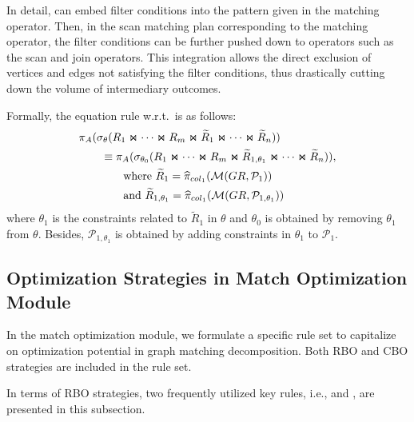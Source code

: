 In detail, \filterrule can embed filter conditions into the pattern given in the matching operator.
Then, in the scan matching plan corresponding to the matching operator, the filter conditions can be further pushed down to operators such as the scan and join operators.
This integration allows the direct exclusion of vertices and edges not satisfying the filter conditions, thus drastically cutting down the volume of intermediary outcomes.

Formally, the equation rule w.r.t.~\filterrule is as follows:
\begin{equation}
    \begin{split}
        & \pi_A(\sigma_{\theta}(R_1 \Join \cdots \Join R_m \Join \widetilde{R}_1 \Join \cdots \Join \widetilde{R}_n)) \\
        & \hspace*{2em} \equiv \pi_A(\sigma_{\theta_0}(R_1 \Join \cdots \Join R_m \Join \widetilde{R}_{1, \theta_1} \Join \cdots \Join \widetilde{R}_n)), \\
        & \hspace*{4em} \text{where } \widetilde{R}_{1} = \widehat{\pi}_{col_1}(\mathcal{M}(GR, \mathcal{P}_1)) \\
        & \hspace*{4em} \text{and } \widetilde{R}_{1,\theta_1} = \widehat{\pi}_{col_1}(\mathcal{M}(GR, \mathcal{P}_{1,\theta_1}))
    \end{split}
\end{equation}
where $\theta_1$ is the constraints related to $\widetilde{R}_1$ in $\theta$ and $\theta_0$ is obtained by removing $\theta_1$ from $\theta$.
Besides, $\mathcal{P}_{1,\theta_1}$ is obtained by adding constraints in $\theta_1$ to $\mathcal{P}_1$.


\subsection{Optimization Strategies in Match Optimization Module}

In the match optimization module, we formulate a specific rule set to capitalize on optimization potential in graph matching decomposition.
Both RBO and CBO strategies are included in the rule set.

In terms of RBO strategies, two frequently utilized key rules, i.e., \trimrule and \fusionrule, are presented in this subsection.

